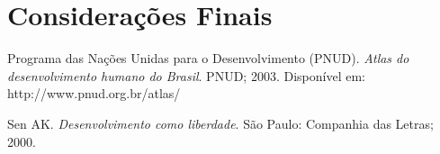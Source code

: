 \documentclass[conference]{IEEEtran}
\begin{document}

\section{Considerações Finais}



\begin{thebibliography}{1}


Programa das Nações Unidas para o Desenvolvimento (PNUD). \emph{Atlas do desenvolvimento humano do Brasil}. PNUD; 2003. Disponível em: http://www.pnud.org.br/atlas/

Sen AK. \emph{Desenvolvimento como liberdade}. São Paulo: Companhia das Letras; 2000.


\end{thebibliography}




\end{document}
